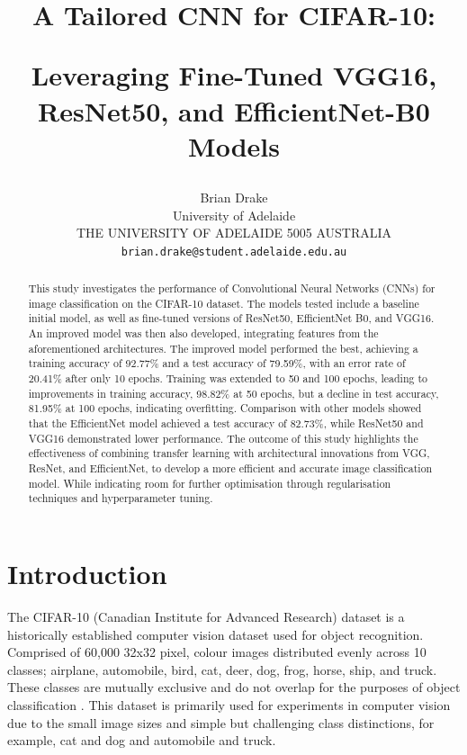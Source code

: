 \documentclass[10pt,twocolumn,letterpaper]{article}
\begin{document}
\title{A Tailored CNN for CIFAR-10: 

Leveraging Fine-Tuned VGG16, ResNet50, and EfficientNet-B0 Models}

\author{Brian Drake\\
University of Adelaide\\
THE UNIVERSITY OF ADELAIDE
5005 AUSTRALIA\\
{\tt\small brian.drake@student.adelaide.edu.au}
}
\maketitle

\begin{abstract}
This study investigates the performance of Convolutional Neural Networks (CNNs) for image classification on the CIFAR-10 dataset. The models tested include a baseline initial model, as well as fine-tuned versions of ResNet50, EfficientNet B0, and VGG16. An improved model was then also developed, integrating features from the aforementioned architectures. The improved model performed the best, achieving a training accuracy of 92.77\% and a test accuracy of 79.59\%, with an error rate of 20.41\% after only 10 epochs. Training was extended to 50 and 100 epochs, leading to improvements in training accuracy, 98.82\% at 50 epochs, but a decline in test accuracy, 81.95\% at 100 epochs, indicating overfitting. Comparison with other models showed that the EfficientNet model achieved a test accuracy of 82.73\%, while ResNet50 and VGG16 demonstrated lower performance. The outcome of this study highlights the effectiveness of combining transfer learning with architectural innovations from VGG, ResNet, and EfficientNet, to develop a more efficient and accurate image classification model. While indicating room for further optimisation through regularisation techniques and hyperparameter tuning.
\end{abstract}

\section{Introduction}
\label{sec:intro}
The CIFAR-10 (Canadian Institute for Advanced Research) dataset is a historically established computer vision dataset used for object recognition. Comprised of 60,000 32x32 pixel, colour images distributed evenly across 10 classes; airplane, automobile, bird, cat, deer, dog, frog, horse, ship, and truck. These classes are mutually exclusive and do not overlap for the purposes of object classification \cite{cifar10}. This dataset is primarily used for experiments in computer vision due to the small image sizes and simple but challenging class distinctions, for example, cat and dog and automobile and truck.
\end{document}

